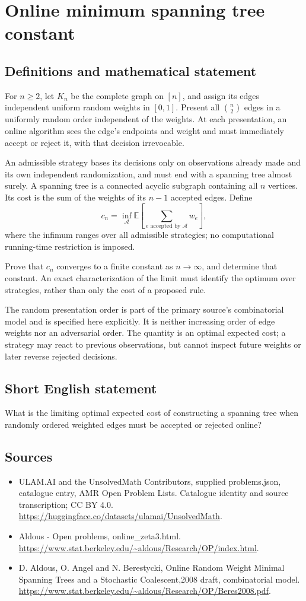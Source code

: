 \documentclass[11pt,a4paper]{article}
\begin{document}
\section*{Online minimum spanning tree constant}\label{statement}

\subsection{Definitions and mathematical statement}
For $n\ge2$, let $K_n$ be the complete graph on $[n]$, and assign its edges independent uniform random weights in $[0,1]$. Present all $\binom n2$ edges in a uniformly random order independent of the weights. At each presentation, an online algorithm sees the edge's endpoints and weight and must immediately accept or reject it, with that decision irrevocable.

An admissible strategy bases its decisions only on observations already made and its own independent randomization, and must end with a spanning tree almost surely. A spanning tree is a connected acyclic subgraph containing all $n$ vertices. Its cost is the sum of the weights of its $n-1$ accepted edges. Define
\[
c_n=\inf_{\mathcal A}\mathbb E\left[
\sum_{e\text{ accepted by }\mathcal A}w_e\right],
\]
where the infimum ranges over all admissible strategies; no computational running-time restriction is imposed.

Prove that $c_n$ converges to a finite constant as $n\to\infty$, and determine that constant. An exact characterization of the limit must identify the optimum over strategies, rather than only the cost of a proposed rule.

The random presentation order is part of the primary source's combinatorial model and is specified here explicitly. It is neither increasing order of edge weights nor an adversarial order. The quantity is an optimal expected cost; a strategy may react to previous observations, but cannot inspect future weights or later reverse rejected decisions.
\subsection{Short English statement}
What is the limiting optimal expected cost of constructing a spanning tree when randomly ordered weighted edges must be accepted or rejected online?
\subsection{Sources}
\begin{itemize}
\item[S1] ULAM.AI and the UnsolvedMath Contributors, supplied problems.json, catalogue entry, AMR Open Problem Lists. Catalogue identity and source transcription; CC BY 4.0.
\url{https://huggingface.co/datasets/ulamai/UnsolvedMath}.
\item[S2] Aldous - Open problems, online\_zeta3.html. 
\url{https://www.stat.berkeley.edu/~aldous/Research/OP/index.html}.
\item[S3] D. Aldous, O. Angel and N. Berestycki, Online Random Weight Minimal Spanning Trees and a Stochastic Coalescent,2008 draft, combinatorial model.
\url{https://www.stat.berkeley.edu/~aldous/Research/OP/Beres2008.pdf}.
\end{itemize}
\end{document}
